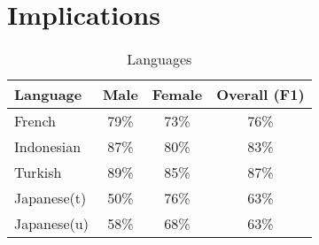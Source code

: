 \documentclass[runningheads]{llncs}
\begin{document}
	\section{Implications}
	
	\begin{table}
		\caption{Languages }
		\begin{tabular}{| l | c | c | c | }
			\hline
			Language  &  Male  & Female & Overall (F1)\\
			\hline
			French & 79\% & 73\% & 76\% \\
			Indonesian & 87\% & 80\% & 83\% \\
			Turkish & 89\% & 85\% & 87\% \\
			Japanese(t) & 50\% & 76\% & 63\% \\
			Japanese(u) & 58\% & 68\% & 63\% \\
			\hline
		\end{tabular}
		\label{table:language}
	\end{table}
%	
\end{document}
